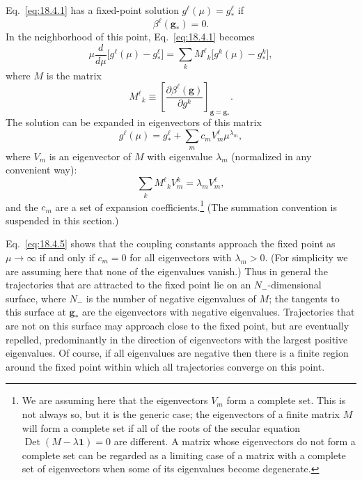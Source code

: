 Eq.~\eqref{eq:18.4.1} has a fixed-point solution $g^\ell(\mu)=g_*^\ell$ if
\begin{equation}
\beta^\ell(\mathbf{g}_*)=0.
\tag{18.4.2}\label{eq:18.4.2}
\end{equation}
In the neighborhood of this point, Eq.~\eqref{eq:18.4.1} becomes
\begin{equation}
\mu\frac{d}{d\mu}\bigl[g^\ell(\mu)-g_*^\ell\bigr]
=\sum_k M^\ell{}_k\bigl[g^k(\mu)-g_*^k\bigr],
\tag{18.4.3}\label{eq:18.4.3}
\end{equation}
where $M$ is the matrix
\begin{equation}
M^\ell{}_k\equiv\left[\frac{\partial\beta^\ell(\mathbf{g})}{\partial g^k}\right]_{\mathbf{g}=\mathbf{g}_*}.
\tag{18.4.4}\label{eq:18.4.4}
\end{equation}
The solution can be expanded in eigenvectors of this matrix
\begin{equation}
g^\ell(\mu)=g_*^\ell+\sum_m c_m V_m^\ell\mu^{\lambda_m},
\tag{18.4.5}\label{eq:18.4.5}
\end{equation}
where $V_m$ is an eigenvector of $M$ with eigenvalue $\lambda_m$ (normalized in any convenient way):
\begin{equation}
\sum_k M^\ell{}_k V_m^k=\lambda_m V_m^\ell,
\tag{18.4.6}\label{eq:18.4.6}
\end{equation}
and the $c_m$ are a set of expansion coefficients.\footnote{We are assuming here that the eigenvectors $V_m$ form a complete set. This is not always so, but it is the generic case; the eigenvectors of a finite matrix $M$ will form a complete set if all of the roots of the secular equation $\operatorname{Det}(M-\lambda\mathbf{1})=0$ are different. A matrix whose eigenvectors do not form a complete set can be regarded as a limiting case of a matrix with a complete set of eigenvectors when some of its eigenvalues become degenerate.} (The summation convention is suspended in this section.)

Eq.~\eqref{eq:18.4.5} shows that the coupling constants approach the fixed point as $\mu\to\infty$ if and only if $c_m=0$ for all eigenvectors with $\lambda_m>0$. (For simplicity we are assuming here that none of the eigenvalues vanish.) Thus in general the trajectories that are attracted to the fixed point lie on an $N_-$-dimensional surface, where $N_-$ is the number of negative eigenvalues of $M$; the tangents to this surface at $\mathbf{g}_*$ are the eigenvectors with negative eigenvalues. Trajectories that are not on this surface may approach close to the fixed point, but are eventually repelled, predominantly in the direction of eigenvectors with the largest positive eigenvalues. Of course, if all eigenvalues are negative then there is a finite region around the fixed point within which all trajectories converge on this point.

